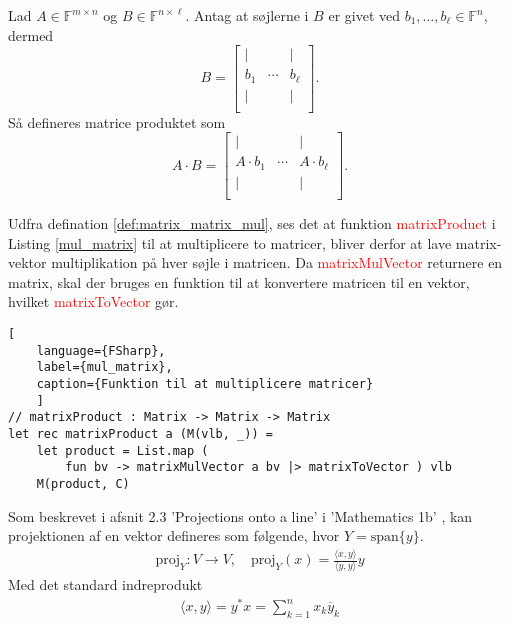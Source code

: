 \begin{definition}\label{def:matrix_matrix_mul}
    Lad $A \in \mathbb{F}^{m \times n}$ og $B \in \mathbb{F}^{n \times \ell}$. Antag at søjlerne i $B$ er givet ved $b_1, \ldots, b_\ell \in \mathbb{F}^n$, dermed
    \[
        B = \begin{bmatrix}
    | &  & | \\
    b_1 & \cdots & b_\ell \\
    | &  & | \\
\end{bmatrix}.
\]
Så defineres matrice produktet som
\[
    A \cdot B = \begin{bmatrix}
        | &  & | \\
        A \cdot b_1 & \cdots & A \cdot b_\ell \\
        | &  & | \\
    \end{bmatrix}.
    \]
\end{definition}
Udfra defination \ref{def:matrix_matrix_mul}, ses det at funktion \textcolor{red}{matrixProduct} i Listing \ref{mul_matrix} til at multiplicere to matricer, bliver derfor at lave matrix-vektor multiplikation på hver søjle i matricen. Da \textcolor{red}{matrixMulVector} returnere en matrix, skal der bruges en funktion til at konvertere matricen til en vektor, hvilket \textcolor{red}{matrixToVector} gør.
\begin{lstlisting}[
    language={FSharp}, 
    label={mul_matrix}, 
    caption={Funktion til at multiplicere matricer}
    ]
// matrixProduct : Matrix -> Matrix -> Matrix
let rec matrixProduct a (M(vlb, _)) =
    let product = List.map (
        fun bv -> matrixMulVector a bv |> matrixToVector ) vlb
    M(product, C)
\end{lstlisting}
    
Som beskrevet i afsnit 2.3 'Projections onto a line' i 'Mathematics 1b' , kan projektionen af en vektor defineres som følgende, hvor $Y = \text{span}\{y\}$.
\begin{align}
    \text{proj}_Y : V \rightarrow V, \quad \text{proj}_Y(x) = \frac{\langle x, y \rangle}{\langle y, y \rangle} y
    \label{proj}
\end{align}
Med det standard indreprodukt 
\begin{align}
    \langle x, y \rangle = y^* x =\sum_{k=1}^{n} x_k \overline{y}_k
\end{align}


